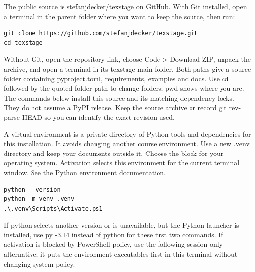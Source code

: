 \documentclass[a4paper,11pt]{article}
\begin{document}
The public source is \href{https://github.com/stefanjdecker/texstage}{stefanjdecker/\allowbreak{}texstage on GitHub}.\allowbreak{} With Git installed, open a terminal in the parent folder where you want to keep the source, then run:\par

\par\noindent\begin{minipage}{\linewidth}
\begin{Verbatim}
git clone https://github.com/stefanjdecker/texstage.git
cd texstage
\end{Verbatim}
\end{minipage}\par\smallskip

Without Git, open the repository link, choose Code > Download ZIP, unpack the archive, and open a terminal in its texstage-\allowbreak{}main folder.\allowbreak{} Both paths give a source folder containing pyproject.\allowbreak{}toml, requirements, examples and docs.\allowbreak{} Use cd followed by the quoted folder path to change folders; pwd shows where you are.\allowbreak{} The commands below install this source and its matching dependency locks.\allowbreak{} They do not assume a PyPI release.\allowbreak{} Keep the source archive or record git rev-\allowbreak{}parse HEAD so you can identify the exact revision used.\par

A virtual environment is a private directory of Python tools and dependencies for this installation.\allowbreak{} It avoids changing another course environment.\allowbreak{} Use a new .\allowbreak{}venv directory and keep your documents outside it.\allowbreak{} Choose the block for your operating system.\allowbreak{} Activation selects this environment for the current terminal window.\allowbreak{} See the \href{https://docs.python.org/3/library/venv.html}{Python environment documentation}.\par

\par\noindent\begin{minipage}{\linewidth}
\begin{Verbatim}
python --version
python -m venv .venv
.\.venv\Scripts\Activate.ps1
\end{Verbatim}
\end{minipage}\par\smallskip

If python selects another version or is unavailable, but the Python launcher is installed, use py -\allowbreak{}3.\allowbreak{}14 instead of python for these first two commands.\allowbreak{} If activation is blocked by PowerShell policy, use the following session-\allowbreak{}only alternative; it puts the environment executables first in this terminal without changing system policy.\par
\end{document}
